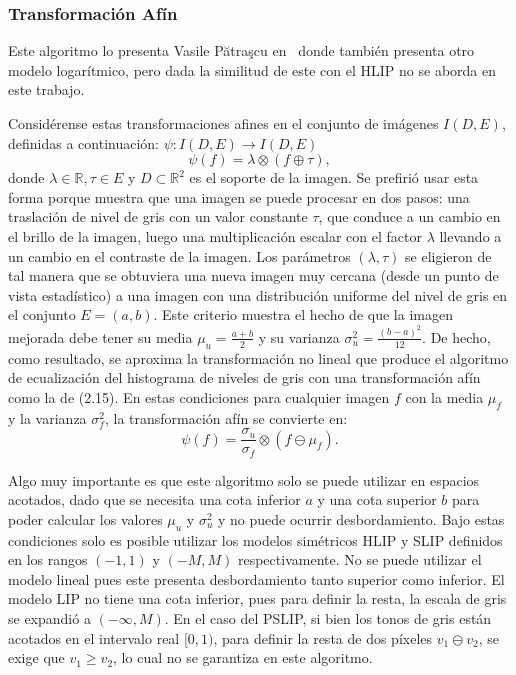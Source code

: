 \subsubsection{Transformaci\'on Af\'in}

Este algoritmo lo presenta Vasile Pătraşcu en~\cite{patrascu2003gray} donde tambi\'en presenta otro modelo logar\'itmico, pero dada la similitud de este con el HLIP no se aborda en este trabajo.

Consid\'erense estas transformaciones afines en el conjunto de imágenes $I (D, E)$, definidas a continuaci\'on: $\psi : I (D, E) \to I (D, E )$
\begin{equation}
	\psi(f)=\lambda\otimes(f\oplus\tau),
\end{equation}
donde $\lambda \in \mathbb{R}, \tau \in E$ y $D\subset\mathbb{R}^2$ es el soporte de la imagen. Se prefirió usar esta forma porque muestra que una imagen se puede procesar en dos pasos: una traslación de nivel de gris con un valor constante $\tau$, que conduce a un cambio en el brillo de la imagen, luego una multiplicación escalar con el factor $\lambda$  llevando a un cambio en el contraste de la imagen. Los parámetros $(\lambda, \tau )$ se eligieron de tal manera que se obtuviera una nueva imagen muy cercana (desde un punto de vista estadístico) a una imagen con una distribución uniforme del nivel de gris en el conjunto $E=(a,b)$. Este criterio muestra el hecho de que la imagen mejorada debe tener su media $\mu_u = \frac{a+b}{2}$ y su varianza $\sigma_u^2 = \frac{(b-a)^2}{12}$. De hecho, como resultado, se aproxima la transformaci\'on no lineal que produce el algoritmo de ecualización del histograma de niveles de gris con una transformaci\'on afín como la de (2.15). En estas condiciones para cualquier imagen $f$ con la media $\mu_f$ y la varianza $\sigma_f^2 $, la transformaci\'on afín se convierte en:
\begin{equation}
	\psi(f)=\frac{\sigma_u}{\sigma_f}\otimes(f\ominus\mu_f).
\end{equation}

Algo muy importante es que este algoritmo solo se puede utilizar en espacios acotados, dado que se necesita una cota inferior $a$ y una cota superior $b$ para poder calcular los valores $\mu_u$ y $\sigma_u^2$ y no puede ocurrir desbordamiento. Bajo estas condiciones solo es posible utilizar los modelos sim\'etricos HLIP y SLIP definidos en los rangos $(-1,1)$ y $(- M, M)$ respectivamente. No se puede utilizar el modelo lineal pues este presenta desbordamiento tanto superior como inferior. El modelo LIP no tiene una cota inferior, pues para definir la resta, la escala de gris se expandi\'o a $(-\infty,M)$. En el caso del PSLIP, si bien los tonos de gris est\'an acotados en el intervalo real $[0,1)$, para definir la resta de dos p\'ixeles $v_1\ominus v_2$, se exige que $v_1\geq v_2$, lo cual no se garantiza en este algoritmo.

